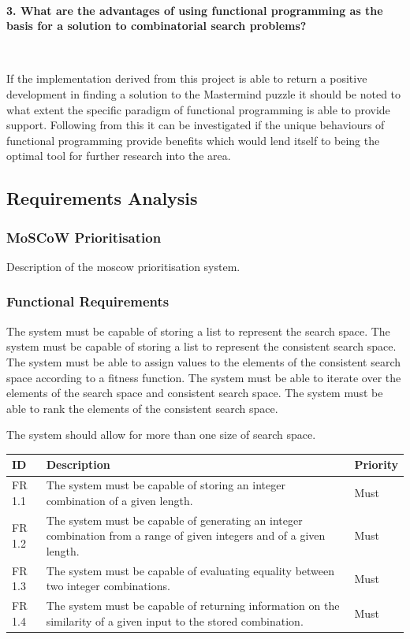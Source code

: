 \documentclass[11pt]{article}  %
\theoremstyle{definition}
\theoremstyle{remark}
\begin{document}
\

\textbf{3. What are the advantages of using functional programming as the basis for a solution to combinatorial search problems?}

\

If the implementation derived from this project is able to return a positive development in finding a solution to the Mastermind puzzle it should be noted to what extent the specific paradigm of functional programming is able to provide support. Following from this it can be investigated if the unique behaviours of functional programming provide benefits which would lend itself to being the optimal tool for further research into the area.
\subsection {Requirements Analysis}

\subsubsection {MoSCoW Prioritisation}

Description of the moscow prioritisation system.

\subsubsection {Functional Requirements}

The system must be capable of storing a list to represent the search space.
The system must be capable of storing a list to represent the consistent search space.
The system must be able to assign values to the elements of the consistent search space according to a fitness function.
The system must be able to iterate over the elements of the search space and consistent search space.
The system must be able to rank the elements of the consistent search space.

The system should allow for more than one size of search space.

\begin{tabularx}{\textwidth}{|X|X|X|}
\hline
ID     & Description                                                                         & Priority \\ \hline
FR 1.1 & The system must be capable of storing an integer combination of a given length.     & Must     \\ \hline
FR 1.2 & The system must be capable of generating an integer combination from a range of given integers and of a given length. & Must \\ \hline
FR 1.3 & The system must be capable of evaluating equality between two integer combinations. & Must     \\ \hline
FR 1.4 & The system must be capable of returning information on the similarity of a given input to the stored combination.     & Must \\ \hline
\end{tabularx}
\end{document}

